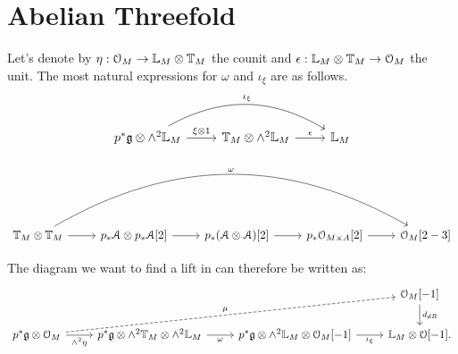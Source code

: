 \chapter{Abelian Threefold}

Let's denote by $\eta : \mathcal{O}_M \to \mathbb L_M \otimes \mathbb T_M$ the counit and $\epsilon : \mathbb L_M \otimes \mathbb T_M \to \mathcal{O}_M$
the unit.
The most natural expressions for $\omega$ and $\iota_{\xi}$ are as follows.
\[
\begin{tikzcd}
p^*\fr g \otimes \wedge^2 \bbL_M \arrow{r}{\xi \otimes 1} \arrow[bend left]{rr}{\iota_{\xi}} &
\bbT_M \otimes \wedge^2 \bbL_M\arrow{r}{\epsilon} & \bbL_M
\end{tikzcd}
\]
\[
\begin{tikzcd}
\bbT_M\otimes \bbT_M \arrow{r}\arrow[bend left]{rrrr}{\omega} & p_*\mathcal{A} \otimes p_*\mathcal{A}[2] \arrow{r} & 
p_*(\mathcal{A}\otimes \mathcal{A})[2]
\arrow{r} & p_*\mathcal{O}_{M \times A}[2] \arrow{r} & \mathcal{O}_M[2-3]
\end{tikzcd}
\]

The diagram we want to find a lift in can therefore be written as:
\[
\begin{tikzcd}
\; & & & \mathcal{O}_M[-1]\arrow{d}{d_{dR}} \\
p^* \fr g \otimes \mathcal{O}_M \arrow[swap]{r}{\wedge^2 \eta}\arrow[dashed]{urrr}{\mu} & 
p^* \fr g \otimes \wedge^2 \bbT_M \otimes \wedge^2 \bbL_M \arrow[swap]{r}{\omega} &
p^* \fr g \otimes \wedge^2 \bbL_M \otimes \mathcal{O}_M[-1]\arrow[swap]{r}{\iota_{\xi}} & \bbL_M \otimes \mathcal{O}[-1] .
\end{tikzcd}
\]
